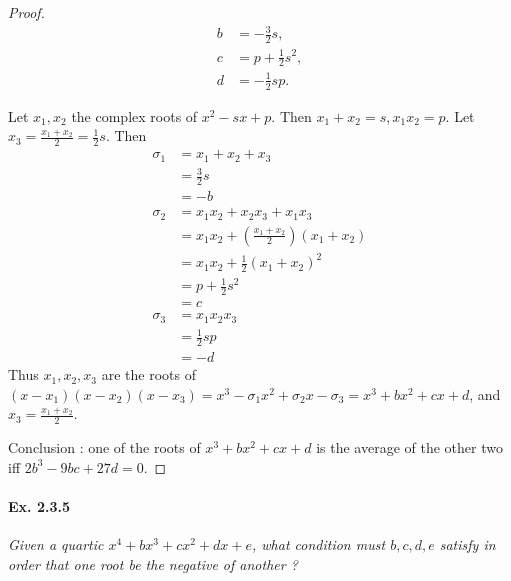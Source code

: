 \documentclass[11pt,a4paper]{article}
\begin{document}
\begin{proof}
\begin{align*}
b &= -\frac{3}{2} s,\\
c &= p +\frac{1}{2} s^2,\\
d&=-\frac{1}{2} sp.
\end{align*}

Let $x_1,x_2$ the complex roots of $x^2-sx+p$. Then $x_1+x_2 = s,x_1x_2=p$. Let $x_3 = \frac{x_1+x_2}{2} = \frac{1}{2}s$.
Then
\begin{align*}
\sigma_1 &= x_1+x_2+x_3\\
&= \frac{3}{2} s\\
&=-b\\
\sigma_2 &=x_1x_2+x_2x_3+x_1x_3\\
&=x_1x_2 +\left(\frac{x_1+x_2}{2}\right)(x_1+x_2)\\
&=x_1x_2 + \frac{1}{2}(x_1+x_2)^2\\
&= p +\frac{1}{2} s^2\\
&=c\\
\sigma_3 &= x_1x_2 x_3\\
&=\frac{1}{2}sp\\
&=-d
\end{align*}
Thus $x_1,x_2,x_3$ are the roots of $(x-x_1)(x-x_2)(x-x_3) = x^3 -\sigma_1x^2+\sigma_2x-\sigma_3 = x^3+bx^2+cx+d$, and $x_3 = \frac{x_1+x_2}{2}$.


Conclusion : one of the roots of $x^3+bx^2+cx+d$ is the average of the other two iff $2b^3 - 9bc + 27d = 0.$
\end{proof}

\paragraph{Ex. 2.3.5}

{\it Given a quartic $x^4+bx^3+cx^2+dx+e$, what condition must $b,c,d,e$ satisfy in order that one root be the negative of another ?
}
\end{document}
